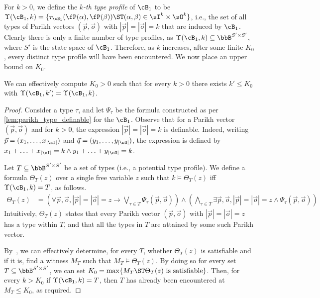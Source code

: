 For $k>0$, we define the \emph{$k$-th type profile} of $\cB_1$ to be $\Upsilon(\cB_1,k)=\{\tau_{\cB_1}(\fP(\alpha),\fP(\beta))\ST (\alpha,\beta)\in \sI^k \times \sO^k\}$, i.e., the set of all types of Parikh vectors $(\vec{p},\vec{o})$ with $|\vec{p}|=|\vec{o}|=k$ that are induced by $\cB_1$. Clearly there is only a finite number of type profiles, as $\Upsilon(\cB_1,k)\subseteq \bbB^{S'\times S'}$, where $S'$ is the state space of $\cB_1$. Therefore, as $k$ increases, after some finite $K_0$, every distinct type profile will have been encountered. We now place an upper bound on $K_0$.

\begin{lemma}
	\label{lem:type_profile_bound}
	We can effectively compute $K_0>0$ such that for every $k>0$ there exists $k'\le K_0$ with $\Upsilon(\cB_1,k')=\Upsilon(\cB_1,k)$.
	\end{lemma}
\begin{proof}
	Consider a type $\tau$, and let $\Psi_\tau$ be the \PA formula constructed as per \cref{lem:parikh_type_definable} for the \NFA $\cB_1$. Observe that for a Parikh vector $(\vec{p},\vec{o})$ and for $k>0$, the expression $|\vec{p}|=|\vec{o}|=k$ is \PA definable. Indeed, writing $\vec{p}=(x_1,\ldots,x_{|\sI|})$ and $\vec{q}=(y_1,\ldots,y_{|\sO|})$, the expression is defined by $x_1+\ldots+x_{|\sI|}=k \wedge y_1+\ldots+y_{|\sO|}=k$.
	
	Let $T\subseteq \bbB^{S'\times S'}$ be a set of types (i.e., a potential type profile). We define a \PA formula $\Theta_T(z)$ over a single free variable $z$ such that $k\models \Theta_T(z)$ iff $\Upsilon(\cB_1,k)=T$, as follows.
	\begin{align*}
		\Theta_T(z)&=\left(\forall \vec{p},\vec{o}, |\vec{p}|=|\vec{o}|=z \to \bigvee_{\tau\in T}\Psi_\tau(\vec{p},\vec{o})\right)
		\wedge \left(\bigwedge_{\tau\in T}\exists \vec{p},\vec{o}, |\vec{p}|=|\vec{o}|=z \wedge \Psi_\tau(\vec{p},\vec{o})\right)
	\end{align*}
Intuitively, $\Theta_T(z)$ states that every Parikh vector $(\vec{p},\vec{o})$ with $|\vec{p}|=|\vec{o}|=z$ has a type within $T$, and that all the types in $T$ are attained by some such Parikh vector.

By~\cite{Fischer1974,Borosh1976}, we can effectively determine, for every $T$, whether $\Theta_T(z)$ is satisfiable and if it is, find a witness $M_T$ such that $M_T\models \Theta_T(z)$. By doing so for every set $T\subseteq \bbB^{S'\times S'}$, we can set $K_0=\max\{M_T\ST \Theta_T(z) \text{ is satisfiable}\}$. Then, for every $k>K_0$ if $\Upsilon(\cB_1,k)=T$, then $T$ has already been encountered at $M_T\le K_0$, as required. 
\end{proof}

